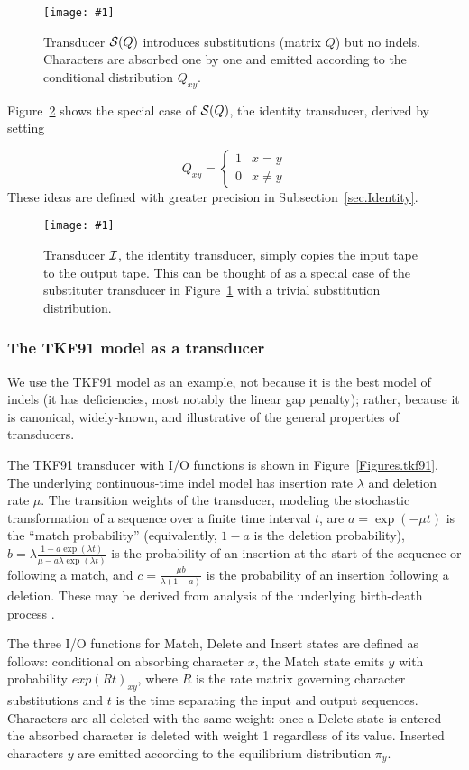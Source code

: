 \documentclass{article}
\newcommand{\secref}[1]{Subsection~\ref{sec.#1}}
\newcommand{\seclabel}[1]{\label{sec.#1}}
\newcommand{\figref}[1]{Figure~\ref{Figures.#1}}
\newcommand{\figlabel}[1]{\label{Figures.#1}}
\newcommand{\easyfig}[4]{
\begin{figure}
\texttt{[image: \#1]}
\caption{ \figlabel{#3} #4}
\end{figure}}
\newcommand{\pdffig}[2]{\easyfig{#1-fig.pdf}{}{#1}{#2}}
\newcommand\substitute{{\cal S}}
\newcommand\identity{{\cal I}}
\begin{document}
\pdffig{substituter}{Transducer $\substitute(Q)$ introduces substitutions (matrix $Q$) but no indels.  
Characters are absorbed one by one and emitted according to the conditional distribution $Q_{xy}$.}

\figref{identity} shows the special case of $\substitute(Q)$, the identity transducer,
derived by setting

\[
Q_{xy} = \left\{
\begin{array}{ll}
1 & x=y \\
0 & x \neq y
\end{array}
\right.
\]
These ideas are defined with greater precision in \secref{Identity}. 

\pdffig{identity}{Transducer $\identity$, the identity transducer, 
simply copies the input tape to the output tape.  This can be thought of as a special case of the substituter transducer in \figref{substituter} with a trivial substitution distribution. }


\subsubsection{The TKF91 model as a transducer}
\seclabel{tkf91}

We use the TKF91 model as an example, not because it is the best model of indels
 (it has deficiencies, most notably the linear gap penalty);
rather, because it is canonical, widely-known, and illustrative of the general properties of transducers.  

The TKF91 transducer with I/O functions is shown in \figref{tkf91}.  
The underlying continuous-time indel model has insertion rate $\lambda$ and deletion rate $\mu$.
The transition weights of the transducer,
modeling the stochastic transformation of a sequence over a finite time interval $t$,
are
$a = \exp(-\mu t)$ is the ``match probability'' (equivalently, $1-a$ is the deletion probability),
$b = \lambda\frac{1 - a \exp(\lambda t)}{\mu - a \lambda \exp(\lambda t)}$ is the probability of an insertion at the start of the sequence or following a match,
and $c = \frac{\mu b}{\lambda(1-a)}$ is the probability of an insertion following a deletion. 
These may be derived from analysis of the underlying birth-death process \cite{ThorneEtal91}.

The three I/O functions for Match, Delete and Insert states are defined as follows:
conditional on absorbing character $x$, the Match state emits  $y$ with probability
$exp(Rt)_{xy}$, where $R$ is the rate matrix governing character substitutions and 
$t$ is the time separating the input and output sequences. 
Characters are all deleted with the same weight: once a Delete state is entered the 
absorbed character is deleted with weight 1 regardless of its value.  
Inserted characters $y$ are emitted according to the equilibrium distribution $\pi_y$.
\end{document}
